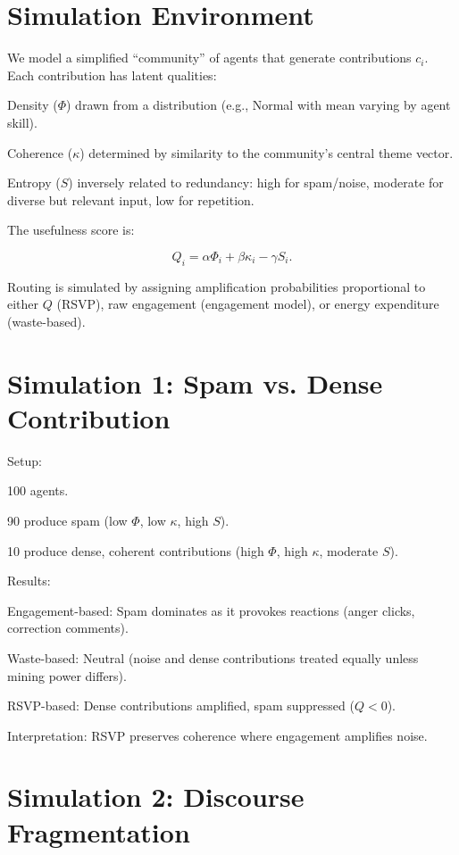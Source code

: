 \documentclass{book}
\begin{document}
\section{Simulation Environment}

We model a simplified ``community'' of agents that generate contributions \( c_i \). Each contribution has latent qualities:

Density (\( \Phi \)) drawn from a distribution (e.g., Normal with mean varying by agent skill).

Coherence (\( \kappa \)) determined by similarity to the community’s central theme vector.

Entropy (\( S \)) inversely related to redundancy: high for spam/noise, moderate for diverse but relevant input, low for repetition.

The usefulness score is:

\[ Q_i = \alpha \Phi_i + \beta \kappa_i - \gamma S_i. \]

Routing is simulated by assigning amplification probabilities proportional to either \( Q \) (RSVP), raw engagement (engagement model), or energy expenditure (waste-based).

\section{Simulation 1: Spam vs. Dense Contribution}

Setup:

100 agents.

90 produce spam (low \( \Phi \), low \( \kappa \), high \( S \)).

10 produce dense, coherent contributions (high \( \Phi \), high \( \kappa \), moderate \( S \)).

Results:

Engagement-based: Spam dominates as it provokes reactions (anger clicks, correction comments).

Waste-based: Neutral (noise and dense contributions treated equally unless mining power differs).

RSVP-based: Dense contributions amplified, spam suppressed (\( Q < 0 \)).

Interpretation: RSVP preserves coherence where engagement amplifies noise.

\section{Simulation 2: Discourse Fragmentation}
\end{document}
